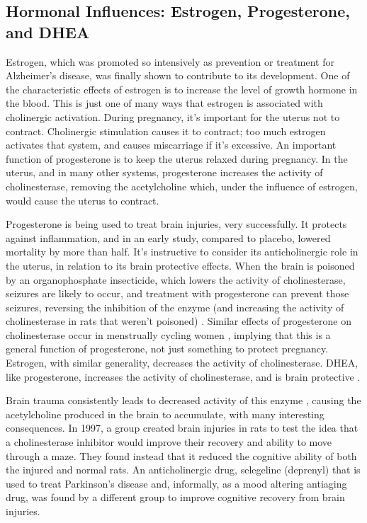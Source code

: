 \documentclass{article}
\begin{document}
\subsection{Hormonal Influences: Estrogen, Progesterone, and DHEA}
Estrogen, which was promoted so intensively as prevention or treatment for Alzheimer's disease, was finally shown to contribute to its development. One of the characteristic effects of estrogen is to increase the level of growth hormone in the blood. This is just one of many ways that estrogen is associated with cholinergic activation. During pregnancy, it's important for the uterus not to contract. Cholinergic stimulation causes it to contract; too much estrogen activates that system, and causes miscarriage if it's excessive. An important function of progesterone is to keep the uterus relaxed during pregnancy. In the uterus, and in many other systems, progesterone increases the activity of cholinesterase, removing the acetylcholine which, under the influence of estrogen, would cause the uterus to contract.

Progesterone is being used to treat brain injuries, very successfully. It protects against inflammation, and in an early study, compared to placebo, lowered mortality by more than half. It's instructive to consider its anticholinergic role in the uterus, in relation to its brain protective effects. When the brain is poisoned by an organophosphate insecticide, which lowers the activity of cholinesterase, seizures are likely to occur, and treatment with progesterone can prevent those seizures, reversing the inhibition of the enzyme (and increasing the activity of cholinesterase in rats that weren't poisoned) \cite{Joshi2010}. Similar effects of progesterone on cholinesterase occur in menstrually cycling women \cite{Fairbrother1989}, implying that this is a general function of progesterone, not just something to protect pregnancy. Estrogen, with similar generality, decreases the activity of cholinesterase. DHEA, like progesterone, increases the activity of cholinesterase, and is brain protective \cite{Aly2011}.

Brain trauma consistently leads to decreased activity of this enzyme \cite{Ostberg2011, Donat2007}, causing the acetylcholine produced in the brain to accumulate, with many interesting consequences. In 1997, a group \cite{Pike1997} created brain injuries in rats to test the idea that a cholinesterase inhibitor would improve their recovery and ability to move through a maze. They found instead that it reduced the cognitive ability of both the injured and normal rats. An anticholinergic drug, selegeline (deprenyl) that is used to treat Parkinson's disease and, informally, as a mood altering antiaging drug, was found by a different group \cite{Zhu2000} to improve cognitive recovery from brain injuries.
\end{document}
